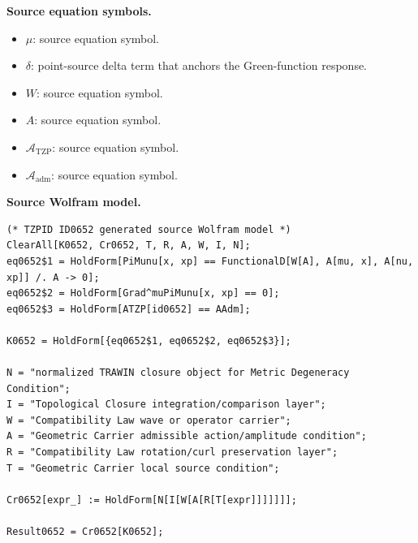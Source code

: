 \begin{minipage}[t]{0.49\linewidth}
\begingroup
\small
\raggedright
\textbf{Source equation symbols.}\par
\begin{itemize}[leftmargin=1.35em,itemsep=1pt,topsep=1pt,parsep=0pt]
    \item $\mu$: source equation symbol.
    \item $\delta$: point-source delta term that anchors the Green-function response.
    \item $W$: source equation symbol.
    \item $A$: source equation symbol.
    \item $\mathcal{A}_{\mathrm{TZP}}$: source equation symbol.
    \item $\mathcal{A}_{\mathrm{adm}}$: source equation symbol.
\end{itemize}
\endgroup
\end{minipage}\hfill
\begin{minipage}[t]{0.47\linewidth}
\begingroup
\scriptsize
\raggedright
\textbf{Source Wolfram model.}\par
\begin{Verbatim}[fontsize=\tiny,breaklines=true,breakanywhere=true]
(* TZPID ID0652 generated source Wolfram model *)
ClearAll[K0652, Cr0652, T, R, A, W, I, N];
eq0652$1 = HoldForm[PiMunu[x, xp] == FunctionalD[W[A], A[mu, x], A[nu, xp]] /. A -> 0];
eq0652$2 = HoldForm[Grad^muPiMunu[x, xp] == 0];
eq0652$3 = HoldForm[ATZP[id0652] == AAdm];

K0652 = HoldForm[{eq0652$1, eq0652$2, eq0652$3}];

N = "normalized TRAWIN closure object for Metric Degeneracy Condition";
I = "Topological Closure integration/comparison layer";
W = "Compatibility Law wave or operator carrier";
A = "Geometric Carrier admissible action/amplitude condition";
R = "Compatibility Law rotation/curl preservation layer";
T = "Geometric Carrier local source condition";

Cr0652[expr_] := HoldForm[N[I[W[A[R[T[expr]]]]]]];

Result0652 = Cr0652[K0652];
\end{Verbatim}
\endgroup
\end{minipage}

